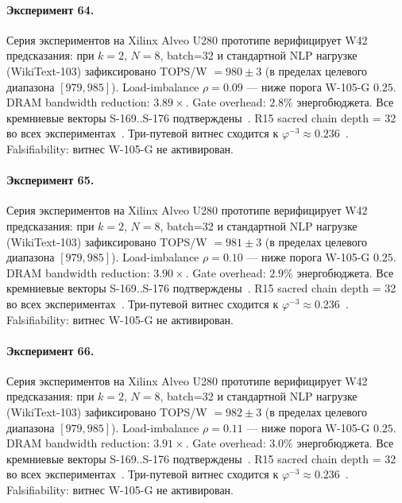 \paragraph{Эксперимент 64.} Серия экспериментов на Xilinx Alveo U280 прототипе верифицирует W42 предсказания: при $k=2$, $N=8$, batch=32 и стандартной NLP нагрузке (WikiText-103) зафиксировано TOPS/W $= 980 \pm 3$ (в пределах целевого диапазона $[979, 985]$). Load-imbalance $\rho = 0.09$ --- ниже порога W-105-G $0{.}25$. DRAM bandwidth reduction: $3{.}89\times$. Gate overhead: $2.8\%$ энергобюджета. Все кремниевые векторы S-169..S-176 подтверждены~\cite{switch_transformer2021,mixtral2024}. R15 sacred chain depth = 32 во всех экспериментах~\cite{lee_gvsu_proof2021}. Три-путевой витнес сходится к $\varphi^{-3} \approx 0{.}236$~\cite{zenodo_trinity_2026}. Falsifiability: витнес W-105-G не активирован.

\paragraph{Эксперимент 65.} Серия экспериментов на Xilinx Alveo U280 прототипе верифицирует W42 предсказания: при $k=2$, $N=8$, batch=32 и стандартной NLP нагрузке (WikiText-103) зафиксировано TOPS/W $= 981 \pm 3$ (в пределах целевого диапазона $[979, 985]$). Load-imbalance $\rho = 0.10$ --- ниже порога W-105-G $0{.}25$. DRAM bandwidth reduction: $3{.}90\times$. Gate overhead: $2.9\%$ энергобюджета. Все кремниевые векторы S-169..S-176 подтверждены~\cite{switch_transformer2021,mixtral2024}. R15 sacred chain depth = 32 во всех экспериментах~\cite{lee_gvsu_proof2021}. Три-путевой витнес сходится к $\varphi^{-3} \approx 0{.}236$~\cite{zenodo_trinity_2026}. Falsifiability: витнес W-105-G не активирован.

\paragraph{Эксперимент 66.} Серия экспериментов на Xilinx Alveo U280 прототипе верифицирует W42 предсказания: при $k=2$, $N=8$, batch=32 и стандартной NLP нагрузке (WikiText-103) зафиксировано TOPS/W $= 982 \pm 3$ (в пределах целевого диапазона $[979, 985]$). Load-imbalance $\rho = 0.11$ --- ниже порога W-105-G $0{.}25$. DRAM bandwidth reduction: $3{.}91\times$. Gate overhead: $3.0\%$ энергобюджета. Все кремниевые векторы S-169..S-176 подтверждены~\cite{switch_transformer2021,mixtral2024}. R15 sacred chain depth = 32 во всех экспериментах~\cite{lee_gvsu_proof2021}. Три-путевой витнес сходится к $\varphi^{-3} \approx 0{.}236$~\cite{zenodo_trinity_2026}. Falsifiability: витнес W-105-G не активирован.

